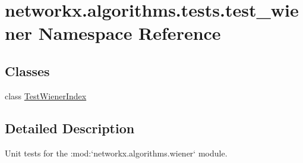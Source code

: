\hypertarget{namespacenetworkx_1_1algorithms_1_1tests_1_1test__wiener}{}\section{networkx.\+algorithms.\+tests.\+test\+\_\+wiener Namespace Reference}
\label{namespacenetworkx_1_1algorithms_1_1tests_1_1test__wiener}
\subsection*{Classes}
\begin{DoxyCompactItemize}
\item 
class \hyperlink{classnetworkx_1_1algorithms_1_1tests_1_1test__wiener_1_1TestWienerIndex}{Test\+Wiener\+Index}
\end{DoxyCompactItemize}


\subsection{Detailed Description}
\begin{DoxyVerb}Unit tests for the :mod:`networkx.algorithms.wiener` module.\end{DoxyVerb}
 